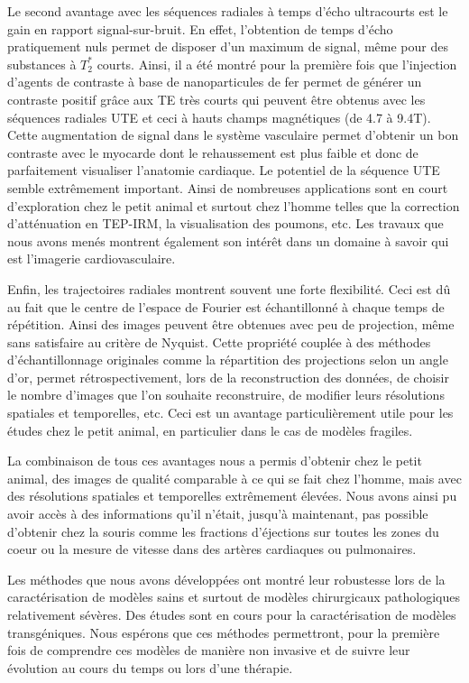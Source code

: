 Le second avantage avec les séquences radiales à temps d'écho ultracourts est le gain en rapport signal-sur-bruit. En effet, l'obtention de temps d'écho pratiquement nuls permet de disposer d'un maximum de signal, même pour des substances à $T_2^*$ courts.
Ainsi, il a été montré pour la première fois que l'injection d'agents de contraste à base de nanoparticules de fer permet de générer un contraste positif grâce aux TE très courts qui peuvent être obtenus avec les séquences radiales UTE et ceci à hauts champs magnétiques (de 4.7 à 9.4T). Cette augmentation de signal dans le système vasculaire permet d'obtenir un bon contraste avec le myocarde dont le rehaussement est plus faible et donc de parfaitement visualiser l'anatomie cardiaque.
Le potentiel de la séquence UTE semble extrêmement important. Ainsi de nombreuses applications sont en court d'exploration chez le petit animal et surtout chez l'homme telles que la correction d'atténuation en TEP-IRM, la visualisation des poumons, etc. Les travaux que nous avons menés montrent également son intérêt dans un domaine à savoir qui est l'imagerie cardiovasculaire.

Enfin, les trajectoires radiales montrent souvent une forte flexibilité. Ceci est dû au fait que le centre de l'espace de Fourier est échantillonné à chaque temps de répétition. Ainsi des images peuvent être obtenues avec peu de projection, même sans satisfaire au critère de Nyquist. Cette propriété couplée à des méthodes d'échantillonnage originales comme la répartition des projections selon un angle d'or, permet rétrospectivement, lors de la reconstruction des données, de choisir le nombre d'images que l'on souhaite reconstruire, de modifier leurs résolutions spatiales et temporelles, etc. Ceci est un avantage particulièrement utile pour les études chez le petit animal, en particulier dans le cas de modèles fragiles.

La combinaison de tous ces avantages nous a permis d'obtenir chez le petit animal, des images de qualité comparable à ce qui se fait chez l'homme, mais avec des résolutions spatiales et temporelles extrêmement élevées. Nous avons ainsi pu avoir accès à des informations qu'il n'était, jusqu'à maintenant, pas possible d'obtenir chez la souris comme les fractions d'éjections sur toutes les zones du coeur ou la mesure de vitesse dans des artères cardiaques ou pulmonaires.

Les méthodes que nous avons développées ont montré leur robustesse lors de la caractérisation de modèles sains et surtout de modèles chirurgicaux pathologiques relativement sévères. Des études sont en cours pour la caractérisation de modèles transgéniques. Nous espérons que ces méthodes permettront, pour la première fois de comprendre ces modèles de manière non invasive et de suivre leur évolution au cours du temps ou lors d'une thérapie.

